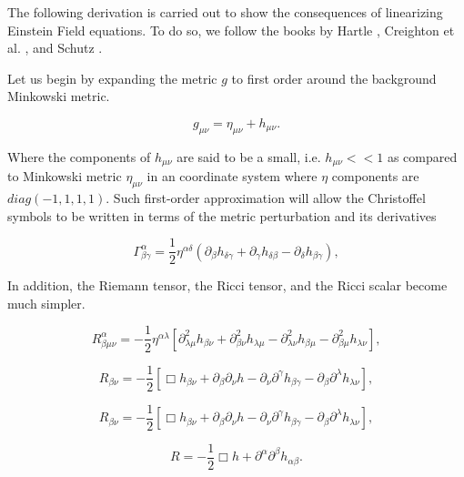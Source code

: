 The following derivation is carried out to show the consequences of linearizing Einstein Field equations. To do so, we follow the books by Hartle \cite{Hartle:2021pel}, Creighton et al. \cite{Creighton:2011zz}, and Schutz \cite{Schutz:1985jx}. 

Let us begin by expanding the metric $g$ to first order around the background Minkowski metric. 

\begin{equation}\label{metric1}
g_{\mu \nu} =  \eta_{\mu \nu} + h_{\mu \nu}.
\end{equation}

Where the components of $h_{\mu \nu}$ are said to be a small, i.e. $h_{\mu \nu}<<1$ as compared to Minkowski metric $\eta_{\mu \nu}$  in an coordinate system where $\eta$ components are $diag(-1,1,1,1)$. Such first-order approximation will allow the Christoffel symbols to be written in terms of the metric perturbation and its derivatives

\begin{equation}\label{cris}
\Gamma^{\alpha}_{\beta \gamma} = \frac{1}{2} \eta^{\alpha \delta}(\partial_{\beta} h_{\delta \gamma} + \partial_{\gamma} h_{\delta \beta} - \partial_{\delta} h_{\beta \gamma}),
\end{equation}

In addition, the Riemann tensor, the Ricci tensor, and the Ricci scalar become much simpler.

\begin{equation}
R^{\alpha}_{\beta \mu\nu} = -\frac{1}{2} \eta^{\alpha \lambda} [ \partial^2_{\lambda \mu} h_{\beta \nu} + \partial^2_{\beta \nu} h_{\lambda \mu} - \partial^2_{\lambda \nu} h_{\beta \mu} - \partial^2_{\beta \mu} h_{\lambda \nu}],
\end{equation}

\begin{equation}
R_{\beta \nu} = -\frac{1}{2} [ \Box h_{\beta \nu} + \partial_{\beta}\partial_{\nu} h - \partial_{\nu} \partial^{\gamma} h_{\beta \gamma} - \partial_{\beta} \partial^{\lambda} h_{\lambda \nu} ],
\end{equation}

\begin{equation}\label{mcieuf}
R_{\beta \nu} = -\frac{1}{2} [ \Box h_{\beta \nu} + \partial_{\beta}\partial_{\nu} h - \partial_{\nu} \partial^{\gamma} h_{\beta \gamma} - \partial_{\beta} \partial^{\lambda} h_{\lambda \nu} ],
\end{equation}


\begin{equation}\label{cxndown}
R = -\frac{1}{2} \Box h + \partial^{\alpha}\partial^{\beta} h_{\alpha \beta}.
\end{equation}

